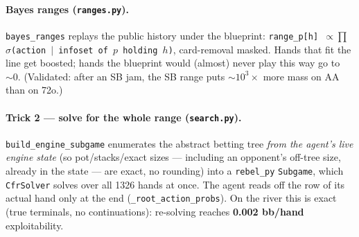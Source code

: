 \documentclass[11pt,a4paper]{article}
\newcommand{\file}[1]{\textcolor{accent}{\texttt{#1}}}
\newcommand{\fn}[1]{\texttt{#1}}
\begin{document}
\begin{center}
\end{center}

\paragraph{Bayes ranges (\file{ranges.py}).} \fn{bayes\_ranges} replays the public
history under the blueprint: \texttt{range\_p[h] $\propto \prod$ $\sigma$(action $\mid$
infoset of $p$ holding $h$)}, card-removal masked. Hands that fit the line get
boosted; hands the blueprint would (almost) never play this way go to $\sim 0$.
(Validated: after an SB jam, the SB range puts $\sim 10^{3}\times$ more mass on AA
than on 72o.)

\paragraph{Trick 2 --- solve for the whole range (\file{search.py}).}
\fn{build\_engine\_subgame} enumerates the abstract betting tree \emph{from the
agent's live engine state} (so pot/stacks/exact sizes --- including an opponent's
off-tree size, already in the state --- are exact, no rounding) into a
\file{rebel\_py} \fn{Subgame}, which \fn{CfrSolver} solves over all 1326 hands at
once. The agent reads off the row of its actual hand only at the end
(\fn{\_root\_action\_probs}). On the river this is exact (true terminals, no
continuations): re-solving reaches \textbf{0.002 bb/hand} exploitability.
\end{document}
